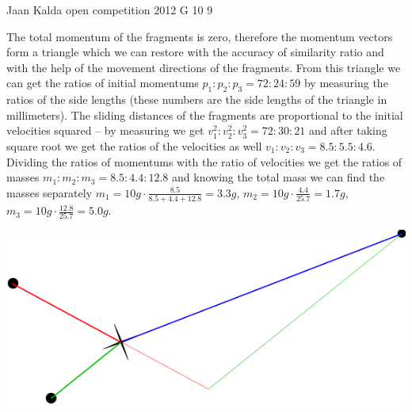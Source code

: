 \documentclass[11pt]{article}
\begin{document}
{Jaan Kalda} %
{open competition} %
{2012} %
{G 10} %
{9} %
{

\ifEngSolution
The total momentum of the fragments is zero, therefore the momentum vectors form a triangle which we can restore with the accuracy of similarity ratio and with the help of the movement directions of the fragments. From this triangle we can get the ratios of initial momentums $p_1 : p_2: p_3 = \num{72} : \num{24} : \num{59}$ by measuring the ratios of the side lengths (these numbers are the side lengths of the triangle in millimeters). The sliding distances of the fragments are proportional to the initial velocities squared – by measuring we get $v_1^2:v_2^2:v_3^2 = \num{72}:\num{30}:\num{21}$ and after taking square root we get the ratios of the velocities as well $v_1 : v_2: v_3 = \num{8,5}:\num{5,5}:\num{4,6}$. Dividing the ratios of momentums with the ratio of velocities we get the ratios of masses $m_1:m_2:m_3=\num{8.5}:\num{4,4}:\num{12,8}$ and knowing the total mass we can find the masses separately $m_1=\SI {10}g\cdot \frac{\num{8,5}}{\num{8,5}+\num{4,4}+\num{12,8}} = \SI{3,3}g$, $m_2=\SI {10}g\cdot \frac{\num{4,4}}{\num{25,7}}=\SI{1,7}g$, $m_3=\SI {10}g\cdot \frac{\num{12,8}}{\num{25,7}}=\SI{5,0}g$.
\begin{center}
\includegraphics[width=\columnwidth]{2012-lahg-10-killud_lah}
\end{center}
\fi
}
\end{document}
